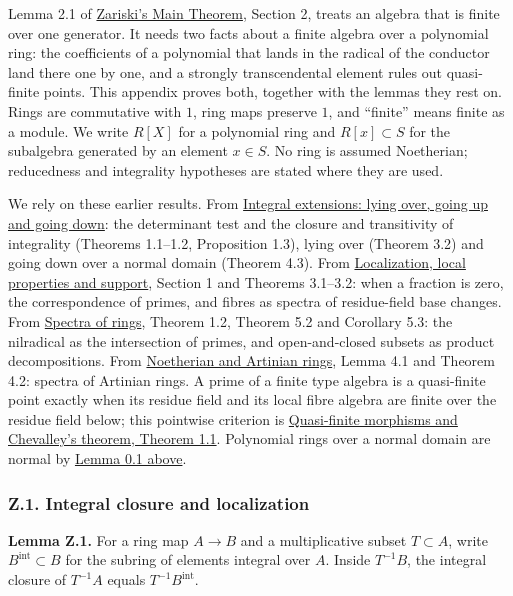 \documentclass[11pt]{article}
\begin{document}
Lemma 2.1 of \href{../AG-MO/AG-MO-12.html}{Zariski's Main Theorem},
Section 2, treats an algebra that is finite over one generator. It needs
two facts about a finite algebra over a polynomial ring: the
coefficients of a polynomial that lands in the radical of the conductor
land there one by one, and a strongly transcendental element rules out
quasi-finite points. This appendix proves both, together with the lemmas
they rest on. Rings are commutative with \(1\), ring maps preserve
\(1\), and ``finite'' means finite as a module. We write \(R[X]\) for a
polynomial ring and \(R[x]\subset S\) for the subalgebra generated by an
element \(x\in S\). No ring is assumed Noetherian; reducedness and
integrality hypotheses are stated where they are used.

We rely on these earlier results. From
\href{../AG-CA/AG-CA-05.html}{Integral extensions: lying over, going up
and going down}: the determinant test and the closure and transitivity
of integrality (Theorems 1.1--1.2, Proposition 1.3), lying over (Theorem
3.2) and going down over a normal domain (Theorem 4.3). From
\href{../AG-CA/AG-CA-02.html}{Localization, local properties and
support}, Section 1 and Theorems 3.1--3.2: when a fraction is zero, the
correspondence of primes, and fibres as spectra of residue-field base
changes. From \href{../AG-CA/AG-CA-01.html}{Spectra of rings}, Theorem
1.2, Theorem 5.2 and Corollary 5.3: the nilradical as the intersection
of primes, and open-and-closed subsets as product decompositions. From
\href{../AG-CA/AG-CA-03.html}{Noetherian and Artinian rings}, Lemma 4.1
and Theorem 4.2: spectra of Artinian rings. A prime of a finite type
algebra is a quasi-finite point exactly when its residue field and its
local fibre algebra are finite over the residue field below; this
pointwise criterion is \href{../AG-MO/AG-MO-06.html}{Quasi-finite
morphisms and Chevalley's theorem, Theorem 1.1}. Polynomial rings over a
normal domain are normal by
\href{the-theorem-on-formal-functions.html\#0-a-normality-input-in-the-algebraic-zariski-main-proof}{Lemma
0.1 above}.

\subsubsection{Z.1. Integral closure and
localization}\label{z.1.-integral-closure-and-localization}

\textbf{Lemma Z.1.} For a ring map \(A\to B\) and a multiplicative
subset \(T\subset A\), write \(B^{\mathrm{int}}\subset B\) for the
subring of elements integral over \(A\). Inside \(T^{-1}B\), the
integral closure of \(T^{-1}A\) equals \(T^{-1}B^{\mathrm{int}}\).
\end{document}
